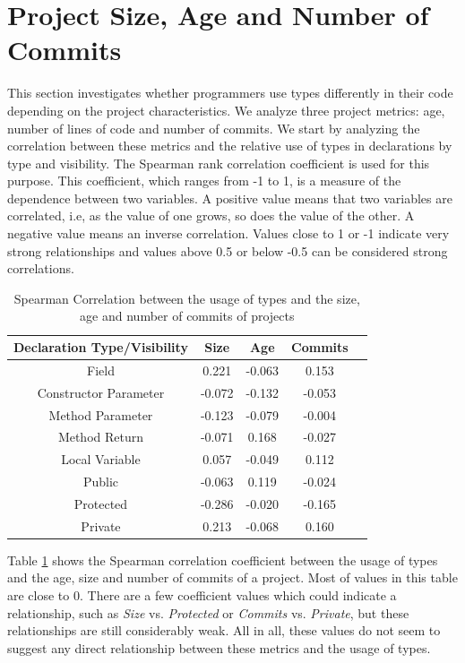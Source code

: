 \documentclass[msc]{ppgccufmg}
\begin{document}
\section{Project Size, Age and Number of Commits\label{sec:results-maturity}}
This section investigates whether programmers use types differently in their code depending on the project characteristics.
We analyze three project metrics: age, number of lines of code and number of commits.
We start by analyzing the correlation between these metrics and the relative use of types in declarations by type and visibility.
The Spearman rank correlation coefficient is used for this purpose.
This coefficient, which ranges from -1 to 1, is a measure of the dependence between two variables.
A positive value means that two variables are correlated, i.e, as the value of one grows, so does the value of the other.
A negative value means an inverse correlation.
Values close to 1 or -1 indicate very strong relationships and values above 0.5 or below -0.5 can be considered strong correlations.

\begin{table}[h!]

\centering{}%
\caption{Spearman Correlation between the usage of types and the size, age and number of commits of projects}
\begin{tabular}{|c|c|c|c|c|}
\hline 
Declaration Type/Visibility & Size    & Age & Commits\\
\hline 
\hline 
Field           &  0.221  & -0.063  &  0.153  \\ \hline
Constructor Parameter   & -0.072  & -0.132  & -0.053  \\ \hline
Method Parameter      & -0.123  & -0.079  & -0.004  \\ \hline
Method Return       & -0.071  &  0.168  & -0.027  \\ \hline
Local Variable        &  0.057  & -0.049  &  0.112  \\ 
\hline       
\hline     
Public            & -0.063  &   0.119 & -0.024  \\ \hline
Protected         & -0.286  &  -0.020 & -0.165  \\ \hline
Private           &  0.213  &  -0.068 &  0.160  \\ \hline
\end{tabular}
\label{tab:all_correlation_maturity}
\end{table}	

Table \ref{tab:all_correlation_maturity} shows the Spearman correlation coefficient between the usage of types and the age, size and number of commits of a project.
Most of values in this table are close to 0.
There are a few coefficient values which could indicate a relationship, such as \emph{Size} vs. \emph{Protected} or \emph{Commits} vs. \emph{Private}, but these relationships are still considerably weak.
All in all, these values do not seem to suggest any direct relationship between these metrics and the usage of types.
\end{document}
